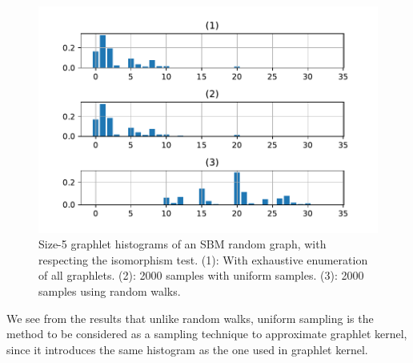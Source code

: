 \begin{figure}[H]
\centering
\includegraphics[scale=0.5]{Dissertation/figs/class0_hist.pdf}
\caption[Graphlet histograms of uniform and random walk sampling techniques]{Size-5 graphlet histograms of an SBM random graph, with respecting the isomorphism test. (1): With exhaustive enumeration of all graphlets. (2): 2000 samples with uniform samples. (3): 2000 samples using random walks. }
\label{fig:graphlet_hist}
\end{figure}
We see from the results that unlike random walks, uniform sampling is the method to be considered as a sampling technique to approximate graphlet kernel, since it introduces the same histogram as the one used in graphlet kernel. 
